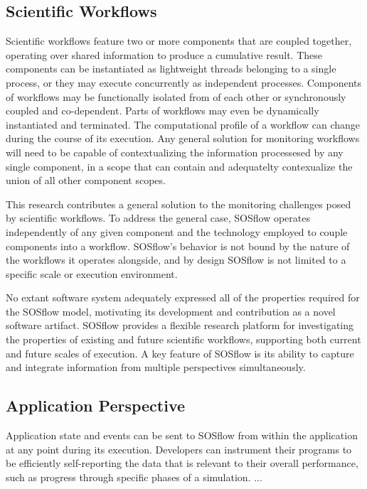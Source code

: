 \subsection{Scientific Workflows} %
%
Scientific workflows feature two or more components that are coupled
together, operating over shared information to produce a cumulative
result.
%
These components can be instantiated as lightweight threads belonging
to a single process, or they may execute concurrently as independent
processes.
%
Components of workflows may be functionally isolated from of each
other or synchronously coupled and co-dependent.
%
Parts of workflows may even be dynamically instantiated and
terminated.
%
The computational profile of a workflow can change during the course
of its execution.
%
Any general solution for monitoring workflows will need to be capable
of contextualizing the information processesed by any single
component, in a scope that can contain and adequatelty contexualize
the union of all other component scopes.
%
\par
%
This research contributes a general solution to the monitoring
challenges posed by scientific workflows.
%
To address the general case, SOSflow operates independently of any
given component and the technology employed to couple components into
a workflow.
%
SOSflow's behavior is not bound by the nature of the workflows it
operates alongside, and by design SOSflow is not limited to a specific
scale or execution environment.
%
%
%
\par
%
No extant software system adequately expressed all of the properties
required for the SOSflow model, motivating its development and
contribution as a novel software artifact.
%
SOSflow provides a flexible research platform for investigating the
properties of existing and future scientific workflows, supporting
both current and future scales of execution.
%
A key feature of SOSflow is its ability to capture and integrate information
from multiple perspectives simultaneously.
%
\subsection{Application Perspective} %
%
Application state and events can be sent to SOSflow from within the application
at any point during its execution.
%
Developers can instrument their programs to be efficiently self-reporting
the data that is relevant to their overall performance, such as progress
through specific phases of a simulation.
%
...
%

